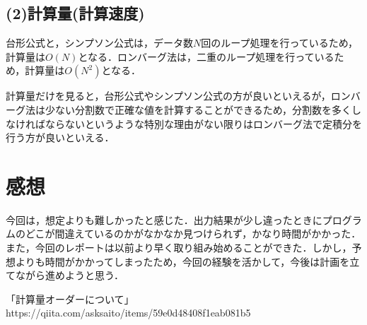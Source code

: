 \documentclass[titlepage,dvipdfmx]{jsarticle}
\begin{document}
\subsection*{(2)計算量(計算速度)}
台形公式と，シンプソン公式は，データ数$N$回のループ処理を行っているため，計算量は$O(N)$となる．ロンバーグ法は，二重のループ処理を行っているため，計算量は$O(N^2)$となる．

計算量だけを見ると，台形公式やシンプソン公式の方が良いといえるが，ロンバーグ法は少ない分割数で正確な値を計算することができるため，分割数を多くしなければならないというような特別な理由がない限りはロンバーグ法で定積分を行う方が良いといえる．

\section{感想}
今回は，想定よりも難しかったと感じた．出力結果が少し違ったときにプログラムのどこが間違えているのかがなかなか見つけられず，かなり時間がかかった．また，今回のレポートは以前より早く取り組み始めることができた．しかし，予想よりも時間がかかってしまったため，今回の経験を活かして，今後は計画を立てながら進めようと思う．



\begin{thebibliography}{99}
 「計算量オーダーについて」
https://qiita.com/asksaito/items/59e0d48408f1eab081b5
\end{thebibliography}
\end{document}
